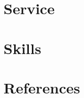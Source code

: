 \documentclass{prometheus_cv}
\begin{document}
\section{Service}


\section{Skills}


\section{References}

\end{document}
